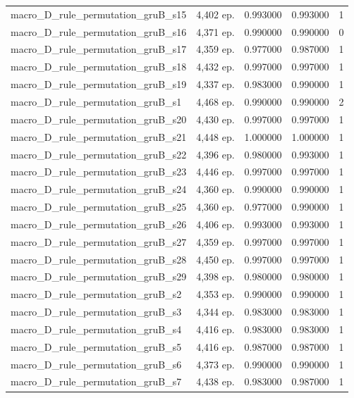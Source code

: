 \begin{tabular}{llrrr}
macro\_D\_rule\_permutation\_gruB\_s15 & 4,402 ep. & 0.993000 & 0.993000 & 1 \\
macro\_D\_rule\_permutation\_gruB\_s16 & 4,371 ep. & 0.990000 & 0.990000 & 0 \\
macro\_D\_rule\_permutation\_gruB\_s17 & 4,359 ep. & 0.977000 & 0.987000 & 1 \\
macro\_D\_rule\_permutation\_gruB\_s18 & 4,432 ep. & 0.997000 & 0.997000 & 1 \\
macro\_D\_rule\_permutation\_gruB\_s19 & 4,337 ep. & 0.983000 & 0.990000 & 1 \\
macro\_D\_rule\_permutation\_gruB\_s1 & 4,468 ep. & 0.990000 & 0.990000 & 2 \\
macro\_D\_rule\_permutation\_gruB\_s20 & 4,430 ep. & 0.997000 & 0.997000 & 1 \\
macro\_D\_rule\_permutation\_gruB\_s21 & 4,448 ep. & 1.000000 & 1.000000 & 1 \\
macro\_D\_rule\_permutation\_gruB\_s22 & 4,396 ep. & 0.980000 & 0.993000 & 1 \\
macro\_D\_rule\_permutation\_gruB\_s23 & 4,446 ep. & 0.997000 & 0.997000 & 1 \\
macro\_D\_rule\_permutation\_gruB\_s24 & 4,360 ep. & 0.990000 & 0.990000 & 1 \\
macro\_D\_rule\_permutation\_gruB\_s25 & 4,360 ep. & 0.977000 & 0.990000 & 1 \\
macro\_D\_rule\_permutation\_gruB\_s26 & 4,406 ep. & 0.993000 & 0.993000 & 1 \\
macro\_D\_rule\_permutation\_gruB\_s27 & 4,359 ep. & 0.997000 & 0.997000 & 1 \\
macro\_D\_rule\_permutation\_gruB\_s28 & 4,450 ep. & 0.997000 & 0.997000 & 1 \\
macro\_D\_rule\_permutation\_gruB\_s29 & 4,398 ep. & 0.980000 & 0.980000 & 1 \\
macro\_D\_rule\_permutation\_gruB\_s2 & 4,353 ep. & 0.990000 & 0.990000 & 1 \\
macro\_D\_rule\_permutation\_gruB\_s3 & 4,344 ep. & 0.983000 & 0.983000 & 1 \\
macro\_D\_rule\_permutation\_gruB\_s4 & 4,416 ep. & 0.983000 & 0.983000 & 1 \\
macro\_D\_rule\_permutation\_gruB\_s5 & 4,416 ep. & 0.987000 & 0.987000 & 1 \\
macro\_D\_rule\_permutation\_gruB\_s6 & 4,373 ep. & 0.990000 & 0.990000 & 1 \\
macro\_D\_rule\_permutation\_gruB\_s7 & 4,438 ep. & 0.983000 & 0.987000 & 1 \\

\end{tabular}
